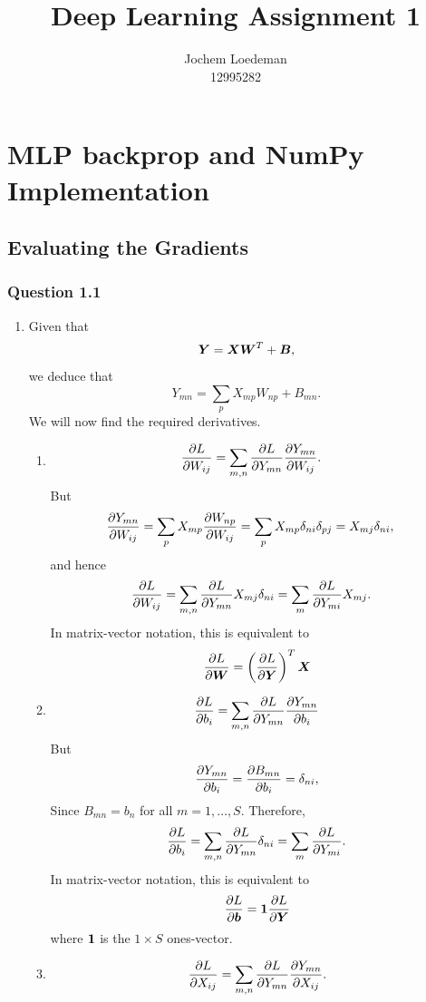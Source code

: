 \documentclass{article}
\title{Deep Learning Assignment 1}
\author{%
  Jochem Loedeman \\
  12995282
}
\begin{document}
\maketitle


\section{MLP backprop and NumPy Implementation}
\subsection{Evaluating the Gradients}
\subsubsection*{Question 1.1}
\begin{enumerate}[label=(\alph*)]
	\item 
	Given that
	$$
	\boldsymbol{Y} = \boldsymbol{X} \boldsymbol{W}^T + \boldsymbol{B},
	$$ we deduce that
	$$
	Y_{mn} = \sum_p X_{mp}W_{np} + B_{mn}.
	$$ We will now find the required derivatives.
	\begin{enumerate}[label=(\roman*)]
	\item 
	$$
	\begin{aligned}
	\frac{\partial L}{\partial W_{ij}} &= \sum_{m, n}\frac{\partial L}{\partial Y_{mn}}\frac{\partial Y_{mn}}{\partial W_{ij}}.
	\end{aligned}
	$$ But
	$$
	\begin{aligned}
	\frac{\partial Y_{mn}}{\partial W_{ij}} &= \sum_pX_{mp}\frac{\partial W_{np}}{\partial W_{ij}} = \sum_pX_{mp}\delta_{ni}\delta_{pj} = X_{mj}\delta_{ni},
	\end{aligned}
	$$ and hence
	$$
	\begin{aligned}
	\frac{\partial L}{\partial W_{ij}} &= \sum_{m, n}\frac{\partial L}{\partial Y_{mn}}X_{mj}\delta_{ni} = \sum_m \frac{\partial L}{\partial Y_{mi}}X_{mj}.
	\end{aligned}
	$$ In matrix-vector notation, this is equivalent to
	$$
	\frac{\partial L}{\partial \boldsymbol{W}} = \left(\frac{\partial L}{\partial \boldsymbol{Y}}\right)^T\boldsymbol{X}
	$$
	\item
	$$
	\frac{\partial L}{\partial b_i} = \sum_{m, n}\frac{\partial L}{\partial Y_{mn}}\frac{\partial Y_{mn}}{\partial b_i}
	$$
	But
	$$
	\frac{\partial Y_{mn}}{\partial b_i} = \frac{\partial B_{mn}}{\partial b_i} = \delta_{ni},
	$$ Since $B_{mn} = b_n$ for all $m = 1,\dots, S$. Therefore,
	$$
	\frac{\partial L}{\partial b_i} = \sum_{m, n}\frac{\partial L}{\partial Y_{mn}}\delta_{ni} = \sum_{m}\frac{\partial L}{\partial Y_{mi}}.
	$$ In matrix-vector notation, this is equivalent to
	$$
	\frac{\partial L}{\partial \boldsymbol{b}} = \boldsymbol{1} \frac{\partial L}{\partial \boldsymbol{Y}}
	$$ where $\boldsymbol{1}$ is the $1 \times S$ ones-vector.
	\item 
	$$
	\frac{\partial L}{\partial X_{ij}} = \sum_{m, n}\frac{\partial L}{\partial Y_{mn}}\frac{\partial Y_{mn}}{\partial X_{ij}}.
$$
\end{enumerate}
\end{enumerate}
\end{document}
